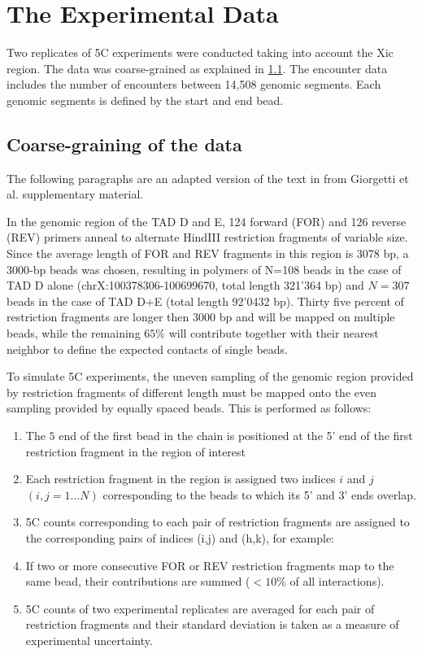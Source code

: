 \documentclass[12pt]{paper}
\begin{document}
\section{The Experimental Data}
Two replicates of 5C experiments were conducted taking into account the Xic region. The data was coarse-grained as explained in \ref{coarseGrainingOfEncounterData}.
The encounter data includes the number of encounters between 14,508 genomic segments. Each genomic segments is defined by the start and end bead.

\subsection{Coarse-graining of the data}\label{coarseGrainingOfEncounterData}
The following paragraphs are an adapted version of the text in from Giorgetti et al. \cite{giorgetti2014predictive} supplementary material.

In the genomic region of the TAD D and E, 124 forward (FOR) and 126 reverse (REV) primers anneal to alternate HindIII restriction fragments of variable size. 
Since the average length of FOR and REV fragments in this region is 3078 bp, a 3000-bp beads was chosen, resulting in polymers of N=108 beads in the case of TAD D alone (chrX:100378306-100699670, total length 321’364 bp) and $N=307$ beads in the case of TAD D+E (total length 92’0432 bp). Thirty five percent of restriction fragments are longer then 3000 bp and will be mapped on multiple beads, while the remaining $65\%$ will contribute together with their nearest neighbor to define the expected contacts of single beads.

To simulate 5C experiments, the uneven sampling of the genomic region provided by restriction fragments of different length must be mapped onto the even sampling provided by equally spaced beads. This is performed as follows:

\begin{enumerate}
\item The $5$ end of the first bead in the chain is positioned at the 5’ end of the first restriction fragment in the region of interest 
\item Each restriction fragment in the region is assigned two indices $i$ and $j$ $(i,j=1…N)$ corresponding to the beads to which its 5’ and 3’ ends overlap.
\item 5C counts corresponding to each pair of restriction fragments are assigned to the corresponding pairs of indices (i,j) and (h,k), for example:
\item If two or more consecutive FOR or REV restriction fragments map to the same bead, their contributions are summed ($<10\%$ of all interactions).
\item 5C counts of two experimental replicates are averaged for each pair of restriction fragments and their standard deviation is taken as a measure of experimental uncertainty.
\end{enumerate}
\end{document}

